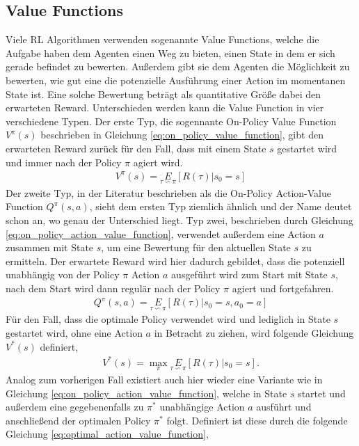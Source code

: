 \documentclass[]{iat}
\begin{document}
\subsection{Value Functions}
Viele RL Algorithmen verwenden sogenannte Value Functions, welche die Aufgabe haben dem Agenten einen Weg zu bieten, einen State in dem er sich gerade befindet zu bewerten. Außerdem gibt sie dem Agenten die Möglichkeit zu bewerten, wie gut eine die potenzielle Ausführung einer Action im momentanen State ist. Eine solche Bewertung beträgt als quantitative Größe dabei den erwarteten Reward. Unterschieden werden kann die Value Function in vier verschiedene Typen. Der erste Typ, die sogennante On-Policy Value Function $V^{\pi}(s)$ beschrieben in Gleichung \ref{eq:on_policy_value_function}, gibt den erwarteten Reward zurück für den Fall, dass mit einem State $s$ gestartet wird und immer nach der Policy $\pi$ agiert wird.
\begin{align}
    V^{\pi}(s) = \underset{\tau \backsim \pi}{E}\left[R(\tau)|s_0 = s\right] \label{eq:on_policy_value_function}
\end{align}
Der zweite Typ, in der Literatur beschrieben als die On-Policy Action-Value Function $Q^{\pi}(s,a)$, sieht dem ersten Typ ziemlich ähnlich und der Name deutet schon an, wo genau der Unterschied liegt. Typ zwei, beschrieben durch Gleichung \ref{eq:on_policy_action_value_function}, verwendet außerdem eine Action $a$ zusammen mit State $s$, um eine Bewertung für den aktuellen State $s$ zu ermitteln. Der erwartete Reward wird hier dadurch gebildet, dass die potenziell unabhängig von der Policy $\pi$ Action $a$ ausgeführt wird zum Start mit State $s$, nach dem Start wird dann regulär nach der Policy $\pi$ agiert und fortgefahren.
\begin{align}
    Q^{\pi}(s,a) = \underset{\tau \backsim \pi}{E}\left[R(\tau)|s_0 = s, a_0 = a\right] \label{eq:on_policy_action_value_function}
\end{align}
Für den Fall, dass die optimale Policy verwendet wird und lediglich in State $s$ gestartet wird, ohne eine Action $a$ in Betracht zu ziehen, wird folgende Gleichung $V^*(s)$ definiert,
\begin{align}
    V^{*}(s) = \underset{\pi}{\max}\underset{\tau \backsim \pi}{E}\left[R(\tau)|s_0 = s\right]. \label{eq:optimal_value_function}
\end{align}
Analog zum vorherigen Fall existiert auch hier wieder eine Variante wie in Gleichung \ref{eq:on_policy_action_value_function}, welche in State $s$ startet und außerdem eine gegebenenfalls zu $\pi^*$ unabhängige Action $a$ ausführt und anschließend der optimalen Policy $\pi^*$ folgt. Definiert ist diese durch die folgende Gleichung \ref{eq:optimal_action_value_function},
\end{document}
